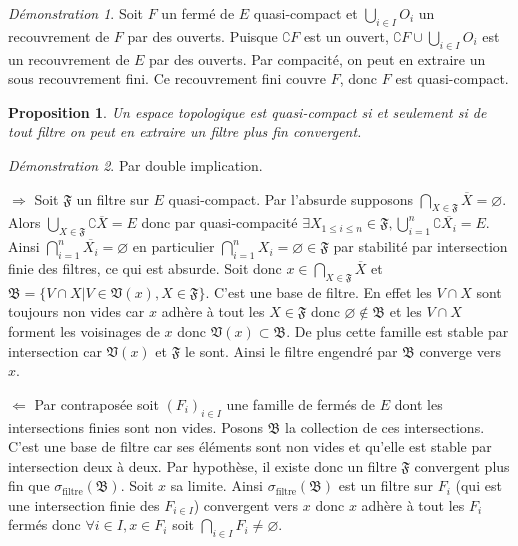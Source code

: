 \documentclass[a4paper, 11pt, french]{book}
\newenvironment{itemise}{\itemize}{\enditemize}
\theoremstyle{plain} %
\newtheorem{proposition}{Proposition}
\theoremstyle{definition} %
\theoremstyle{remark} %
\newtheorem*{demonstration}{Démonstration}
\newcommand{\1}{\mathds{1}}
\newcommand\vide{\varnothing}
\newcommand{\infegal}{\leqslant}
\begin{document}
\begin{demonstration}
	Soit $F$ un fermé de $E$ quasi-compact et $\bigcup_{i\in I}O_i$ un recouvrement de $F$ par des ouverts.
	Puisque $\complement F$ est un ouvert, $\complement F\cup\bigcup_{i\in I}O_i$ est un recouvrement de $E$ par des ouverts.
	Par compacité, on peut en extraire un sous recouvrement fini.
	Ce recouvrement fini couvre $F$, donc $F$ est quasi-compact.
\end{demonstration}

\begin{proposition}
	Un espace topologique est quasi-compact si et seulement si de tout filtre on peut en extraire un filtre plus fin convergent.
\end{proposition}

\begin{demonstration}
	Par double implication.
	\begin{itemise}
		\item[$\Rightarrow$] Soit $\mathfrak{F}$ un filtre sur $E$ quasi-compact.
		Par l'absurde supposons $\bigcap_{X\in\mathfrak{F}}\overline{X}=\vide$.
		Alors $\bigcup_{X\in\mathfrak{F}}\complement\overline{X}=E$ donc par quasi-compacité $\exists X_{1\infegal i\infegal n}\in\mathfrak{F}, \bigcup_{i=1}^n\complement\overline{X_i}=E$.
		Ainsi $\bigcap_{i=1}^n\overline{X_i}=\vide$ en particulier $\bigcap_{i=1}^nX_i=\vide\in\mathfrak{F}$ par stabilité par intersection finie des filtres, ce qui est absurde.
		Soit donc $x\in\bigcap_{X\in\mathfrak{F}}\overline{X}$ et $\mathfrak{B}=\{V\cap X | V\in\mathfrak{V}(x), X\in\mathfrak{F}\}$.
		C'est une base de filtre.
		En effet les $V\cap X$ sont toujours non vides car $x$ adhère à tout les $X\in\mathfrak{F}$ donc $\vide\notin\mathfrak{B}$ et les $V\cap X$ forment les voisinages de $x$ donc $\mathfrak{V}(x)\subset\mathfrak{B}$.
		De plus cette famille est stable par intersection car $\mathfrak{V}(x)$ et $\mathfrak{F}$ le sont.
		Ainsi le filtre engendré par $\mathfrak{B}$ converge vers $x$.
		\item[$\Leftarrow$] Par contraposée soit $(F_i)_{i\in I}$ une famille de fermés de $E$ dont les intersections finies sont non vides.
		Posons $\mathfrak{B}$ la collection de ces intersections.
		C'est une base de filtre car ses éléments sont non vides et qu'elle est stable par intersection deux à deux.
		Par hypothèse, il existe donc un filtre $\mathfrak{F}$ convergent plus fin que $\sigma_\text{filtre}(\mathfrak{B})$.
		Soit $x$ sa limite.
		Ainsi $\sigma_\text{filtre}(\mathfrak{B})$ est un filtre sur $F_i$ (qui est une intersection finie des $F_{i\in I}$) convergent vers $x$ donc $x$ adhère à tout les $F_i$ fermés donc $\forall i\in I, x\in F_i$ soit $\bigcap_{i\in I}F_i\neq\vide$.
	\end{itemise}
\end{demonstration}
\end{document}
